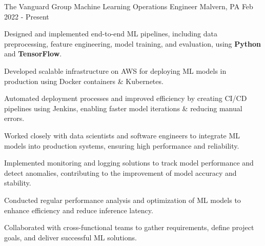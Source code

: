 


\begin{cventries}

\cventry
{The Vanguard Group} %
{Machine Learning Operations Engineer} %
{Malvern, PA} %
{Feb 2022 - Present} %
{ %
\begin{cvitems}
\item Designed and implemented end-to-end ML pipelines, including data preprocessing, feature engineering, model training, and evaluation, using \textbf{Python} and \textbf{TensorFlow}.
\item Developed scalable infrastructure on AWS for deploying ML models in production using Docker containers \& Kubernetes.
\item Automated deployment processes and improved efficiency by creating CI/CD pipelines using Jenkins, enabling faster model iterations \& reducing manual errors.
\item Worked closely with data scientists and software engineers to integrate ML models into production systems, ensuring high performance and reliability.
\item Implemented monitoring and logging solutions to track model performance and detect anomalies, contributing to the improvement of model accuracy and stability.
\item Conducted regular performance analysis and optimization of ML models to enhance efficiency and reduce inference latency.
\item Collaborated with cross-functional teams to gather requirements, define project goals, and deliver successful ML solutions.
\end{cvitems}
}


\end{cventries}
